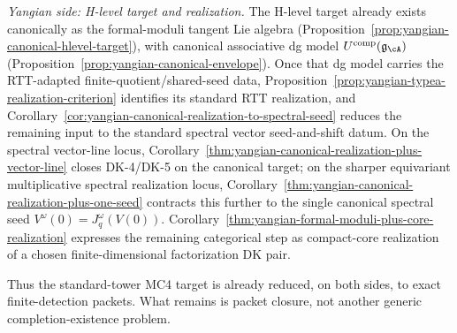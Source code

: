 \begin{proposition}
\begin{enumerate}[label=\textup{(\alph*)}]
 \emph{Yangian side: H-level target and realization.}
 The H-level target already exists canonically as the
 formal-moduli tangent Lie algebra
 (Proposition~\ref{prop:yangian-canonical-hlevel-target}), with
 canonical associative dg model
 $U^{\mathrm{comp}}(\mathfrak{g}_{\cA})$
 (Proposition~\ref{prop:yangian-canonical-envelope}).
 Once that dg model carries the RTT-adapted
 finite-quotient/shared-seed data,
 Proposition~\ref{prop:yangian-typea-realization-criterion} identifies
 its standard RTT realization, and
 Corollary~\ref{cor:yangian-canonical-realization-to-spectral-seed}
 reduces the remaining input to the standard spectral vector
 seed-and-shift datum. On the spectral vector-line locus,
 Corollary~\ref{thm:yangian-canonical-realization-plus-vector-line}
 closes DK-4/DK-5 on the canonical target; on the sharper
 equivariant multiplicative spectral realization locus,
 Corollary~\ref{thm:yangian-canonical-realization-plus-one-seed}
 contracts this further to the single canonical spectral seed
 $V^\omega(0)=J_q^\omega(V(0))$.
 Corollary~\ref{thm:yangian-formal-moduli-plus-core-realization}
 expresses the remaining categorical step as compact-core realization
 of a chosen finite-dimensional factorization DK pair.
\end{enumerate}
Thus the standard-tower MC4 target is already reduced, on both sides,
to exact finite-detection packets. What remains is packet closure, not
another generic completion-existence problem.
\end{proposition}

